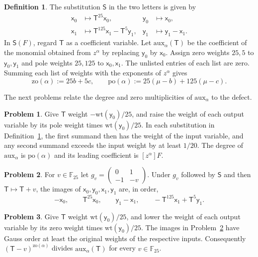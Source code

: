 \documentclass[reqno]{amsart}
\theoremstyle{plain}
\theoremstyle{definition}
\newtheorem{definition}[theorem]{Definition}
\newtheorem{problem}{Problem}[section]
\theoremstyle{remark}
\newcommand{\F}{\mathbb{F}}
\newcommand{\xv}{\mathsf{x}}
\newcommand{\yv}{\mathsf{y}}
\newcommand{\Tv}{\mathsf{T}}
\newcommand{\Sv}{\mathsf{S}}
\newcommand{\wt}{\mathrm{wt}}
\newcommand{\zo}{\mathrm{zo}}
\newcommand{\po}{\mathrm{po}}
\newcommand{\aux}{\mathrm{aux}}
\begin{document}
\begin{definition}\label{def:aux}
The substitution \(\Sv\) in the two letters is given by
\[
\begin{aligned}
  \xv_0&\longmapsto\Tv^{25}\xv_0, & \yv_0&\longmapsto\xv_0,\\
  \xv_1&\longmapsto\Tv^{125}\xv_1-\Tv^5\yv_1,&
  \yv_1&\longmapsto\yv_1-\xv_1 .
\end{aligned}
\]
In \(\Sv(F)\), regard \(\Tv\) as a coefficient variable.  Let \(\aux_\alpha(\Tv)\) be the coefficient of the monomial obtained from \(z^\alpha\) by replacing \(\yv_0\) by \(\xv_0\).  Assign zero weights \(25,5\) to \(\yv_0,\yv_1\) and pole weights \(25,125\) to \(\xv_0,\xv_1\).  The unlisted entries of each list are zero.  Summing each list of weights with the exponents of \(z^\alpha\) gives
\[
  \zo(\alpha):=25b+5c,\qquad
  \po(\alpha):=25(\mu-b)+125(\mu-c).
\]
\end{definition}

The next problems relate the degree and zero multiplicities of \(\aux_\alpha\) to the defect.

\begin{problem}\label{pr:aux-degree}
Give \(\Tv\) weight \(-\wt(\yv_0)/25\), and raise the weight of each output variable by its pole weight times \(\wt(\yv_0)/25\).  In each substitution in Definition~\ref{def:aux}, the first summand then has the weight of the input variable, and any second summand exceeds the input weight by at least \(1/20\).  The degree of \(\aux_\alpha\) is \(\po(\alpha)\) and its leading coefficient is \([z^\alpha]F\).
\end{problem}

\begin{problem}\label{pr:aux-action}
For \(v\in\F_{25}\) let \(g_v=\left(\begin{smallmatrix}0&1\\-1&-v\end{smallmatrix}\right)\).  Under \(g_v\) followed by \(\Sv\) and then \(\Tv\mapsto\Tv+v\), the images of \(\xv_0,\yv_0,\xv_1,\yv_1\) are, in order,
\[
  -\xv_0,\qquad \Tv^{25}\xv_0,\qquad
  \yv_1-\xv_1,\qquad -\Tv^{125}\xv_1+\Tv^5\yv_1 .
\]
\end{problem}

\begin{problem}\label{pr:aux-zeros}
Give \(\Tv\) weight \(\wt(\yv_0)/25\), and lower the weight of each output variable by its zero weight times \(\wt(\yv_0)/25\).  The images in Problem~\ref{pr:aux-action} have Gauss order at least the original weights of the respective inputs.  Consequently \((\Tv-v)^{\zo(\alpha)}\) divides \(\aux_\alpha(\Tv)\) for every \(v\in\F_{25}\).
\end{problem}
\end{document}
